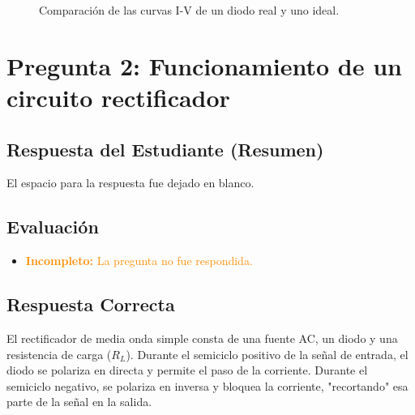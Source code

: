 \documentclass[12pt, a4paper]{article}
\newcommand{\incompleto}[1]{\textcolor{darkorange}{\textbf{Incompleto:} #1}}
\begin{document}
\begin{figure}[h!]
    \centering
    \caption{Comparación de las curvas I-V de un diodo real y uno ideal.}
\end{figure}

\newpage
\section{Pregunta 2: Funcionamiento de un circuito rectificador}

\subsection*{Respuesta del Estudiante (Resumen)}
El espacio para la respuesta fue dejado en blanco.

\subsection*{Evaluación}
\begin{itemize}
    \item \incompleto{La pregunta no fue respondida.}
\end{itemize}

\subsection*{Respuesta Correcta}
El rectificador de media onda simple consta de una fuente AC, un diodo y una resistencia de carga ($R_L$). Durante el semiciclo positivo de la señal de entrada, el diodo se polariza en directa y permite el paso de la corriente. Durante el semiciclo negativo, se polariza en inversa y bloquea la corriente, "recortando" esa parte de la señal en la salida.
\end{document}
